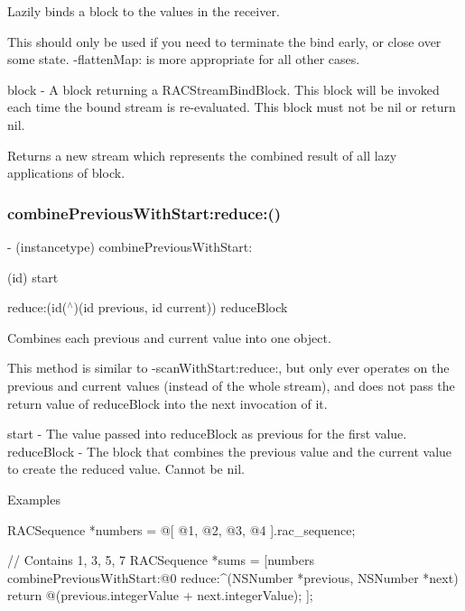Lazily binds a block to the values in the receiver.

This should only be used if you need to terminate the bind early, or close over some state. -\/flatten\+Map\+: is more appropriate for all other cases.

block -\/ A block returning a R\+A\+C\+Stream\+Bind\+Block. This block will be invoked each time the bound stream is re-\/evaluated. This block must not be nil or return nil.

Returns a new stream which represents the combined result of all lazy applications of {\ttfamily block}. \mbox{\label{interface_r_a_c_stream_a698f6ef68be8d3cb34f9be6efaaa5af7}} 
\subsubsection{\texorpdfstring{combine\+Previous\+With\+Start\+:reduce\+:()}{combinePreviousWithStart:reduce:()}\hspace{0.1cm}{\footnotesize\ttfamily [1/3]}}
{\footnotesize\ttfamily -\/ (instancetype) combine\+Previous\+With\+Start\+: \begin{DoxyParamCaption}\item[{(id)}]{start }\item[{reduce:(id($^\wedge$)(id previous, id current))}]{reduce\+Block }\end{DoxyParamCaption}}

Combines each previous and current value into one object.

This method is similar to -\/scan\+With\+Start\+:reduce\+:, but only ever operates on the previous and current values (instead of the whole stream), and does not pass the return value of {\ttfamily reduce\+Block} into the next invocation of it.

start -\/ The value passed into {\ttfamily reduce\+Block} as {\ttfamily previous} for the first value. reduce\+Block -\/ The block that combines the previous value and the current value to create the reduced value. Cannot be nil.

Examples \begin{DoxyVerb} RACSequence *numbers = @[ @1, @2, @3, @4 ].rac_sequence;

 // Contains 1, 3, 5, 7
 RACSequence *sums = [numbers combinePreviousWithStart:@0 reduce:^(NSNumber *previous, NSNumber *next) {
     return @(previous.integerValue + next.integerValue);
 }];
\end{DoxyVerb}


